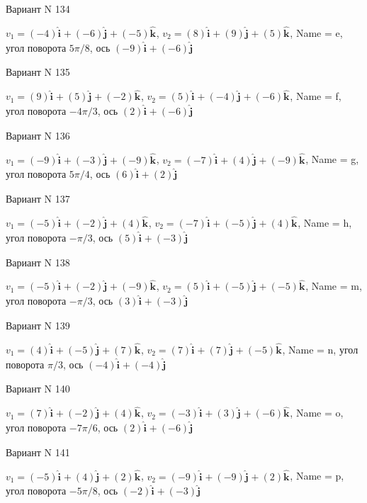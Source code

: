\documentclass[11pt]{report}
\begin{document}
Вариант N 134

$v_1 = (-4)\mathbf{\hat{i}_{}} + (-6)\mathbf{\hat{j}_{}} + (-5)\mathbf{\hat{k}_{}}$, $v_2 = (8)\mathbf{\hat{i}_{}} + (9)\mathbf{\hat{j}_{}} + (5)\mathbf{\hat{k}_{}}$, Name = e, угол поворота $5 \pi / 8$, ось $(-9)\mathbf{\hat{i}_{}} + (-6)\mathbf{\hat{j}_{}}$

Вариант N 135

$v_1 = (9)\mathbf{\hat{i}_{}} + (5)\mathbf{\hat{j}_{}} + (-2)\mathbf{\hat{k}_{}}$, $v_2 = (5)\mathbf{\hat{i}_{}} + (-4)\mathbf{\hat{j}_{}} + (-6)\mathbf{\hat{k}_{}}$, Name = f, угол поворота $- 4 \pi / 3$, ось $(2)\mathbf{\hat{i}_{}} + (-6)\mathbf{\hat{j}_{}}$

Вариант N 136

$v_1 = (-9)\mathbf{\hat{i}_{}} + (-3)\mathbf{\hat{j}_{}} + (-9)\mathbf{\hat{k}_{}}$, $v_2 = (-7)\mathbf{\hat{i}_{}} + (4)\mathbf{\hat{j}_{}} + (-9)\mathbf{\hat{k}_{}}$, Name = g, угол поворота $5 \pi / 4$, ось $(6)\mathbf{\hat{i}_{}} + (2)\mathbf{\hat{j}_{}}$

Вариант N 137

$v_1 = (-5)\mathbf{\hat{i}_{}} + (-2)\mathbf{\hat{j}_{}} + (4)\mathbf{\hat{k}_{}}$, $v_2 = (-7)\mathbf{\hat{i}_{}} + (-5)\mathbf{\hat{j}_{}} + (4)\mathbf{\hat{k}_{}}$, Name = h, угол поворота $- \pi / 3$, ось $(5)\mathbf{\hat{i}_{}} + (-3)\mathbf{\hat{j}_{}}$

Вариант N 138

$v_1 = (-5)\mathbf{\hat{i}_{}} + (-2)\mathbf{\hat{j}_{}} + (-9)\mathbf{\hat{k}_{}}$, $v_2 = (5)\mathbf{\hat{i}_{}} + (-5)\mathbf{\hat{j}_{}} + (-5)\mathbf{\hat{k}_{}}$, Name = m, угол поворота $- \pi / 3$, ось $(3)\mathbf{\hat{i}_{}} + (-3)\mathbf{\hat{j}_{}}$

Вариант N 139

$v_1 = (4)\mathbf{\hat{i}_{}} + (-5)\mathbf{\hat{j}_{}} + (7)\mathbf{\hat{k}_{}}$, $v_2 = (7)\mathbf{\hat{i}_{}} + (7)\mathbf{\hat{j}_{}} + (-5)\mathbf{\hat{k}_{}}$, Name = n, угол поворота $\pi / 3$, ось $(-4)\mathbf{\hat{i}_{}} + (-4)\mathbf{\hat{j}_{}}$

Вариант N 140

$v_1 = (7)\mathbf{\hat{i}_{}} + (-2)\mathbf{\hat{j}_{}} + (4)\mathbf{\hat{k}_{}}$, $v_2 = (-3)\mathbf{\hat{i}_{}} + (3)\mathbf{\hat{j}_{}} + (-6)\mathbf{\hat{k}_{}}$, Name = o, угол поворота $- 7 \pi / 6$, ось $(2)\mathbf{\hat{i}_{}} + (-6)\mathbf{\hat{j}_{}}$

Вариант N 141

$v_1 = (-5)\mathbf{\hat{i}_{}} + (4)\mathbf{\hat{j}_{}} + (2)\mathbf{\hat{k}_{}}$, $v_2 = (-9)\mathbf{\hat{i}_{}} + (-9)\mathbf{\hat{j}_{}} + (2)\mathbf{\hat{k}_{}}$, Name = p, угол поворота $- 5 \pi / 8$, ось $(-2)\mathbf{\hat{i}_{}} + (-3)\mathbf{\hat{j}_{}}$
\end{document}
